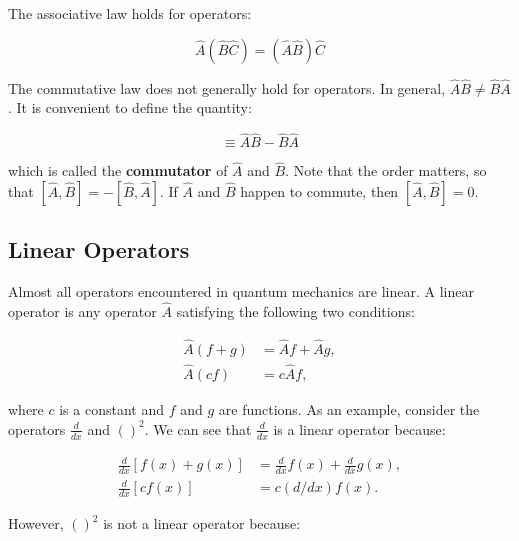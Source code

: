 \documentclass[
  9pt,
]{extbook}
\theoremstyle{definition}
\theoremstyle{definition}
\theoremstyle{definition}
\theoremstyle{remark}
\begin{document}
The associative law holds for operators:

\begin{equation}
\hat{A}(\hat{B}\hat{C}) = (\hat{A}\hat{B})\hat{C}
\label{eq:bp4}
\end{equation}

The commutative law does not generally hold for operators. In general, \(\hat{A} \hat{B} \neq \hat{B} \hat{A}\). It is convenient to define the quantity:

\begin{equation}
[\hat{A}, \hat{B}]\equiv \hat{A} \hat{B} - \hat{B} \hat{A}
\label{eq:bp5}
\end{equation}

which is called the \textbf{commutator} of \(\hat{A}\) and \(\hat{B}\). Note that the order matters, so that \([ \hat{A}, \hat{B}] = - [ \hat{B}, \hat{A}]\). If \(\hat{A}\) and \(\hat{B}\) happen to commute, then \([\hat{A}, \hat{B}] = 0\).

\hypertarget{linear-operators}{%
\subsection{Linear Operators}\label{linear-operators}}

Almost all operators encountered in quantum mechanics are linear. A linear operator is any operator \(\hat{A}\) satisfying the following two conditions:

\begin{equation}
\begin{aligned}
\hat{A} (f + g)  &= \hat{A} f + \hat{A} g, \\
\hat{A} (c f) &= c \hat{A} f,
\end{aligned}
\label{eq:linop1}
\end{equation}

where \(c\) is a constant and \(f\) and \(g\) are functions. As an example, consider the operators \(\frac{d}{dx}\) and \(()^2\). We can see that \(\frac{d}{dx}\) is a linear operator because:

\begin{equation}
\begin{aligned}
\frac{d}{dx}[f(x) + g(x)] &=\frac{d}{dx}f(x) + \frac{d}{dx}g(x), \\
\frac{d}{dx}[c f(x)] &= c (d/dx) f(x).
\end{aligned}
\label{eq:linop2}
\end{equation}

However, \(()^2\) is not a linear operator because:
\end{document}
